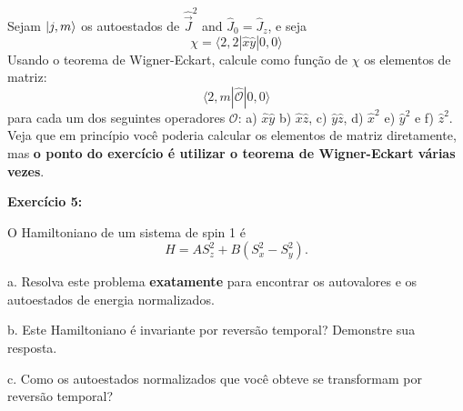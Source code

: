 \documentclass[12pt]{article}
\begin{document}
Sejam $\ket{j,m}$ os autoestados de $\hat{\vec{J}}^2$ and $\hat{J}_0 = \hat{J}_z$,
e seja
\[
\chi=\langle 2,2|\hat{x} \hat{y}| 0,0\rangle
\] 
Usando o teorema de Wigner-Eckart, calcule como função de $\chi$ os elementos de matriz:
\[
\langle 2, m|\hat{\mathcal{O}}| 0,0\rangle
\]
para cada um dos seguintes operadores $\mathcal{O}$:
a) $\hat{x}\hat{y}$ b) $\hat{x} \hat{z}$, c) $\hat{y} \hat{z}$, d) $\hat{x}^{2}$ e) $\hat{y}^{2}$ e f) $\hat{z}^{2}$.
Veja que em princípio você poderia calcular os elementos de matriz diretamente, mas
\textbf{o ponto do exercício é utilizar o teorema de Wigner-Eckart várias vezes}.


\textbf{Exercício 5:} 

O Hamiltoniano de um sistema de spin 1 é
\[
H=A S_{z}^{2}+B\left(S_{x}^{2}-S_{y}^{2}\right).
\]

a. Resolva este problema \textbf{exatamente} para encontrar os autovalores e os autoestados de energia normalizados.

b. Este Hamiltoniano é invariante por reversão temporal? Demonstre sua resposta.

c. Como os autoestados normalizados que você obteve se transformam por reversão temporal?
\end{document}
